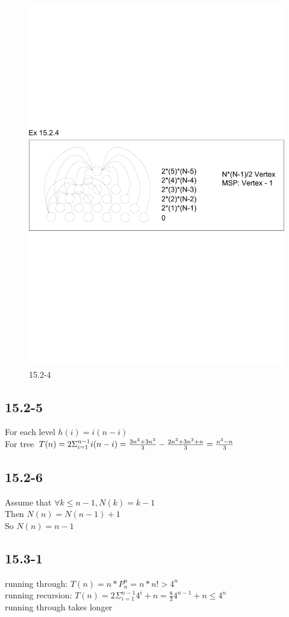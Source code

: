 \documentclass[]{article}
\begin{document}
\begin{figure}
	\centering
	\includegraphics[width=0.8\linewidth]{1524}
	\caption{15.2-4}
	\label{fig:15.2-4}
\end{figure}

\subsection{15.2-5}
For each level $h(i) = i (n-i)$\\
For tree $T(n) = 2\Sigma_{i = 1}^{n-1}i(n-i)
\\ = \frac{3n^3 + 3n^2}{3} - \frac{2n^3 + 3n^2 +n}{3}
\\ = \frac{n^3 - n }{3}$

\subsection{15.2-6}
Assume that $\forall k \le n-1, N(k) = k-1$\\
Then $N(n) = N(n-1) + 1$\\
So $N(n) = n-1$

\subsection{15.3-1}
running through: $T(n) = n*P_{n}^{n} = n*n! > 4^{n}$\\
running recursion: $T(n) = 2\Sigma_{i=1}^{n-1}4^i + n = \frac{8}{3}4^{n-1} + n \le 4^n$\\
running through takes longer
\end{document}
